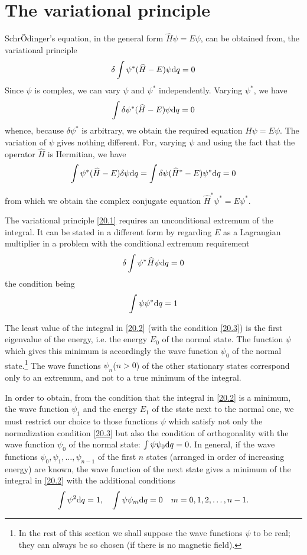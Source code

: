 \section{The variational principle}\label{The variational principle}
Schr\"Odinger’s equation, in the general form $ \hat{H}\psi= E\psi $, can be obtained from, the variational principle
\begin{equation}\label{20.1}
\delta\int\psi^*(\widehat{H}-E)\psi\mathrm{d} q=0
\end{equation}
Since $\psi$ is complex, we can vary $\psi$ and $\psi^*$ independently. Varying $\psi^*$, we have
\[ \int\delta\psi^*(\widehat{H}-E)\psi\mathrm{d} q=0 \]
whence, because $ \delta\psi^* $ is arbitrary, we obtain the required equation $ \hat{H}\psi=E\psi $. The variation of $\psi$ gives nothing different. For, varying $\psi$ and using the fact that the operator $ \hat{H} $ is Hermitian, we have
\[ \int\psi^*(\widehat{H}-E)\delta\psi\mathrm{d} q=\int\delta\psi(\widehat{H}^*-E)\psi^*\mathrm{d} q=0 \]



from which we obtain the complex conjugate equation $ \hat{H}^*\psi^*=E\psi^* $.

The variational principle \eqref{20.1} requires an unconditional extremum of the integral. It can be stated in a different form by regarding $ E $ as a Lagrangian multiplier in a problem with the conditional extremum requirement
\begin{equation}\label{20.2}
\delta\int\psi^*\widehat{H}\psi\mathrm{d} q=0
\end{equation}
the condition being
\begin{equation}\label{20.3}
\int\psi\psi^*\mathrm{d} q=1
\end{equation}

The least value of the integral in \eqref{20.2} (with the condition \eqref{20.3}) is the first eigenvalue of the energy, i.e. the energy $ E_0 $ of the normal state. The function $\psi$ which gives this minimum is accordingly the wave function $\psi_0$ of the normal state.\footnote{In the rest of this section we shall suppose the wave functions $\psi$ to be real; they can always be so chosen (if there is no magnetic field).} The wave functions $ \psi_n $($ n>0 $) of the other stationary states correspond only to an extremum, and not to a true minimum of the integral.

In order to obtain, from the condition that the integral in \eqref{20.2} is a minimum, the wave function $\psi_1$ and the energy $ E_1 $ of the state next to the normal one, we must restrict our choice to those functions $\psi$ which satisfy not only the normalization condition \eqref{20.3} but also the condition of orthogonality with the wave function $\psi_0$ of the normal state: $ \int\psi\psi_0\mathrm{d} q=0 $. In general, if the wave functions $ \psi_0,\psi_1,\dots,\psi_{n-1} $ of the first $ n $ states (arranged in order of increasing energy) are known, the wave function of the next state gives a minimum of the integral in \eqref{20.2} with the additional conditions
\begin{equation}\label{20.4}
\int\psi^2\mathrm{d} q=1,\quad\int\psi\psi_m\mathrm{d} q=0\quad m=0,1,2,\dots,n-1.
\end{equation}


